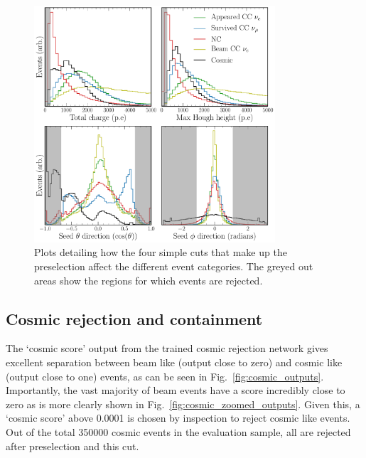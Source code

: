 \begin{figure} %
    \includegraphics[width=0.8\textwidth]{diagrams/6-cvn/chipsnet/explore_simple_cuts.pdf}
    \caption[Plot detailing preselection cuts.]
    {Plots detailing how the four simple cuts that make up the preselection affect the different
        event categories. The greyed out areas show the regions for which events are rejected.}
    \label{fig:explore_simple_cuts}
\end{figure}

\subsection{Cosmic rejection and containment} %
\label{sec:cvn_results_cosmic} %

The `cosmic score' output from the trained cosmic rejection network gives excellent separation
between beam like (output close to zero) and cosmic like (output close to one) events, as can be
seen in Fig.~\ref{fig:cosmic_outputs}. Importantly, the vast majority of beam events have a score
incredibly close to zero as is more clearly shown in Fig.~\ref{fig:cosmic_zoomed_outputs}. Given
this, a `cosmic score' above 0.0001 is chosen by inspection to reject cosmic like events. Out of
the total 350000 cosmic events in the evaluation sample, all are rejected after preselection and
this cut.

